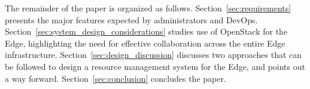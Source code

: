 The remainder of the paper is organized as
follows. Section~\ref{sec:requirements} presents the major features
expected by administrators and DevOps.
Section~\ref{sec:system_design_considerations} studies use of OpenStack for the Edge,
highlighting the need for effective collaboration across the
entire Edge infrastructure. Section~\ref{sec:design_discussion}
discusses two approaches that can be followed to
design a resource management system for the Edge, and points out a way forward. Section~\ref{sec:conclusion} concludes the paper.


